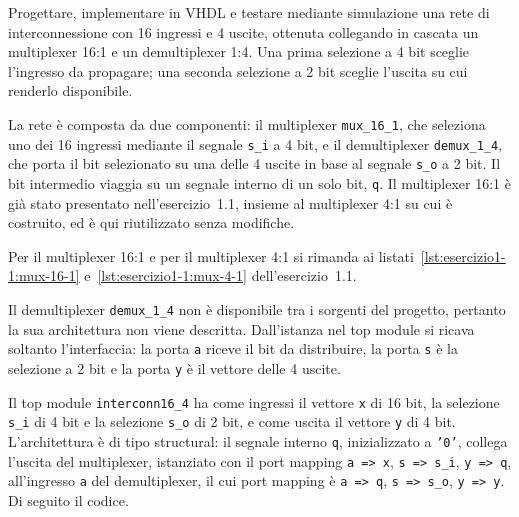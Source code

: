 \label{sec:esercizio1-2}

\begin{traccia}
Progettare, implementare in VHDL e testare mediante simulazione una rete di interconnessione con 16 ingressi e 4 uscite, ottenuta collegando in cascata un multiplexer 16:1 e un demultiplexer 1:4. Una prima selezione a 4 bit sceglie l'ingresso da propagare; una seconda selezione a 2 bit sceglie l'uscita su cui renderlo disponibile.
\end{traccia}

\progetto

La rete è composta da due componenti: il multiplexer \texttt{mux\_16\_1}, che seleziona uno dei 16 ingressi mediante il segnale \texttt{s\_i} a 4 bit, e il demultiplexer \texttt{demux\_1\_4}, che porta il bit selezionato su una delle 4 uscite in base al segnale \texttt{s\_o} a 2 bit. Il bit intermedio viaggia su un segnale interno di un solo bit, \texttt{q}. Il multiplexer 16:1 è già stato presentato nell'esercizio~1.1, insieme al multiplexer 4:1 su cui è costruito, ed è qui riutilizzato senza modifiche.


\implementazione

Per il multiplexer 16:1 e per il multiplexer 4:1 si rimanda ai listati~\ref{lst:esercizio1-1:mux-16-1} e~\ref{lst:esercizio1-1:mux-4-1} dell'esercizio~1.1.

Il demultiplexer \texttt{demux\_1\_4} non è disponibile tra i sorgenti del progetto, pertanto la sua architettura non viene descritta. Dall'istanza nel top module si ricava soltanto l'interfaccia: la porta \texttt{a} riceve il bit da distribuire, la porta \texttt{s} è la selezione a 2 bit e la porta \texttt{y} è il vettore delle 4 uscite.


Il top module \texttt{interconn16\_4} ha come ingressi il vettore \texttt{x} di 16 bit, la selezione \texttt{s\_i} di 4 bit e la selezione \texttt{s\_o} di 2 bit, e come uscita il vettore \texttt{y} di 4 bit. L'architettura è di tipo structural: il segnale interno \texttt{q}, inizializzato a \texttt{'0'}, collega l'uscita del multiplexer, istanziato con il port mapping \texttt{a => x}, \texttt{s => s\_i}, \texttt{y => q}, all'ingresso \texttt{a} del demultiplexer, il cui port mapping è \texttt{a => q}, \texttt{s => s\_o}, \texttt{y => y}. Di seguito il codice.

